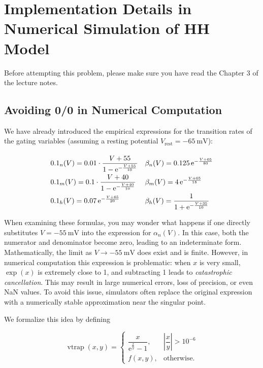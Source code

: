\documentclass{article}
\begin{document}
\section{Implementation Details in Numerical Simulation of HH Model}

Before attempting this problem, please make sure you have read the Chapter 3 of the lecture notes.

\subsection{Avoiding 0/0 in Numerical Computation}

We have already introduced the empirical expressions for the transition
rates of the gating variables (assuming a resting potential
$V_{\text{rest}}=\SI{-65}{\milli\volt}$):

\[
{\renewcommand{\arraystretch}{2}
\begin{array}{l l}
\alpha_n(V) = 0.01\cdot\dfrac{V+55}{1-\mathrm{e}^{-\frac{V+55}{10}}}
&
\beta_n(V)=0.125\,\mathrm{e}^{-\frac{V+65}{80}}
\\
\alpha_m(V) = 0.1\cdot\dfrac{V+40}{1-\mathrm{e}^{-\frac{V+40}{10}}}
&
\beta_m(V) = 4\,\mathrm{e}^{-\frac{V+65}{18}}
\\
\alpha_h(V) = 0.07\,\mathrm{e}^{-\frac{V+65}{20}}
&
\beta_h(V) = \dfrac{1}{1+\mathrm{e}^{-\frac{V+35}{10}}}
\end{array}}
\]

When examining these formulas, you may wonder what happens if one directly
substitutes $V=\SI{-55}{\milli\volt}$ into the expression for $\alpha_n(V)$.
In this case, both the numerator and denominator become zero,
leading to an indeterminate form. Mathematically, the limit as
$V\to\SI{-55}{\milli\volt}$ does exist and is finite.
However, in numerical computation this expression is problematic:
when $x$ is very small, $\exp(x)$ is extremely close to 1,
and subtracting 1 leads to \emph{catastrophic cancellation}.
This may result in large numerical errors, loss of precision,
or even NaN values. 
To avoid this issue, simulators often replace the original expression
with a numerically stable approximation near the singular point.

We formalize this idea by defining

\[
\operatorname{vtrap}(x,y)=
\begin{cases}
\dfrac{x}{\mathrm{e}^{\frac{x}{y}}-1},
&\left|\dfrac{x}{y}\right|>10^{-6}
\\[6pt]
f(x,y),
&\text{otherwise.}
\end{cases}
\]
\end{document}
